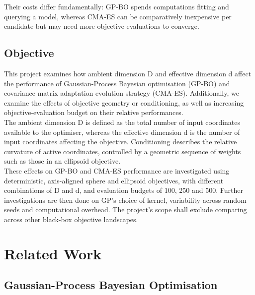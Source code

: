 \documentclass[11pt]{article}
\begin{document}
\noindent Their costs differ fundamentally: GP-BO spends computations fitting and querying a model, whereas CMA-ES can be comparatively inexpensive per candidate but may need more objective evaluations to converge.

\subsection{Objective}

\noindent This project examines how ambient dimension D and effective dimension d affect the performance of Gaussian-Process Bayesian optimisation (GP-BO) and covariance matrix adaptation evolution strategy (CMA-ES). Additionally, we examine the effects of objective geometry or conditioning, as well as increasing objective-evaluation budget on their relative performances.\\

\noindent The ambient dimension D is defined as the total number of input coordinates available to the optimiser, whereas the effective dimension d is the number of input coordinates affecting the objective. Conditioning describes the relative curvature of active coordinates, controlled by a geometric sequence of weights such as those in an ellipsoid objective.\\

\noindent These effects on GP-BO and CMA-ES performance are investigated using deterministic, axis-aligned sphere and ellipsoid objectives, with different combinations of D and d, and evaluation budgets of 100, 250 and 500. Further investigations are then done on GP’s choice of kernel, variability across random seeds and computational overhead. The project’s scope shall exclude comparing across other black-box objective landscapes.

\section{Related Work}

\subsection{Gaussian-Process Bayesian Optimisation}
\end{document}
